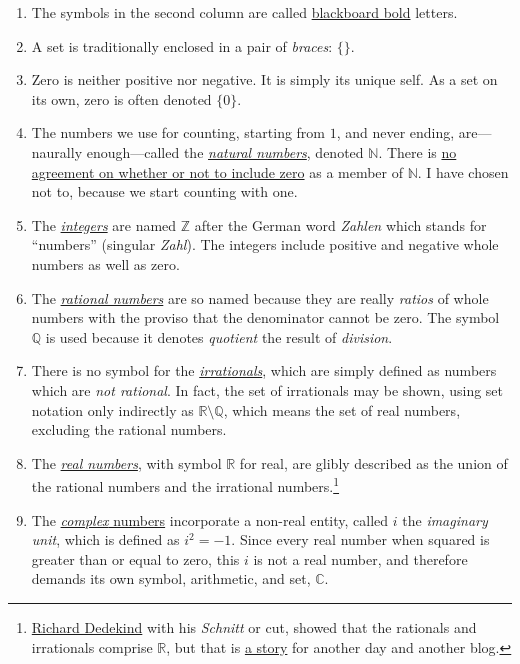 \documentclass[
  a4paper,
]{article}
\begin{document}
\begin{enumerate}
\item
  The symbols in the second column are called
  \href{https://oeis.org/wiki/Blackboard_bold}{blackboard bold} letters.
\item
  A set is traditionally enclosed in a pair of \emph{braces}: \(\{\}\).
\item
  Zero is neither positive nor negative. It is simply its unique self.
  As a set on its own, zero is often denoted \(\{0\}\).
\item
  The numbers we use for counting, starting from \(1\), and never
  ending, are---naurally enough---called the
  \href{https://mathworld.wolfram.com/NaturalNumber.html}{\emph{natural
  numbers}}, denoted \(\mathbb{N}\). There is
  \href{https://en.wikipedia.org/wiki/Natural_number}{no agreement on
  whether or not to include zero} as a member of \(\mathbb{N}\). I have
  chosen not to, because we start counting with one.
\item
  The \href{https://en.wikipedia.org/wiki/Integer}{\emph{integers}} are
  named \(\mathbb{Z}\) after the German word \emph{Zahlen} which stands
  for ``numbers'' (singular \emph{Zahl}). The integers include positive
  and negative whole numbers as well as zero.
\item
  The
  \href{https://mathworld.wolfram.com/RationalNumber.html}{\emph{rational
  numbers}} are so named because they are really \emph{ratios} of whole
  numbers with the proviso that the denominator cannot be zero. The
  symbol \(\mathbb{Q}\) is used because it denotes \emph{quotient} the
  result of \emph{division}.
\item
  There is no symbol for the
  \href{https://mathworld.wolfram.com/IrrationalNumber.html}{\emph{irrationals}},
  which are simply defined as numbers which are \emph{not rational}. In
  fact, the set of irrationals may be shown, using set notation only
  indirectly as \(\mathbb{R}\setminus\mathbb{Q}\), which means the set
  of real numbers, excluding the rational numbers.
\item
  The \href{https://en.wikipedia.org/wiki/Real_number}{\emph{real
  numbers}}, with symbol \(\mathbb{R}\) for real, are glibly described
  as the union of the rational numbers and the irrational
  numbers.\footnote{\href{https://en.wikipedia.org/wiki/Richard_Dedekind}{Richard
    Dedekind} with his \emph{Schnitt} or cut, showed that the rationals
    and irrationals comprise \(\mathbb{R}\), but that is
    \href{https://arpita95b.medium.com/cutting-through-the-confusion-how-dedekind-cuts-build-the-real-numbers-20aeaaec021d}{a
    story} for another day and another blog.}
\item
  The \href{https://en.wikipedia.org/wiki/Complex_number}{\emph{complex}
  numbers} incorporate a non-real entity, called \(i\) the
  \emph{imaginary unit}, which is defined as \(i^2 = -1\). Since every
  real number when squared is greater than or equal to zero, this \(i\)
  is not a real number, and therefore demands its own symbol,
  arithmetic, and set, \(\mathbb{C}\).
\end{enumerate}
\end{document}

